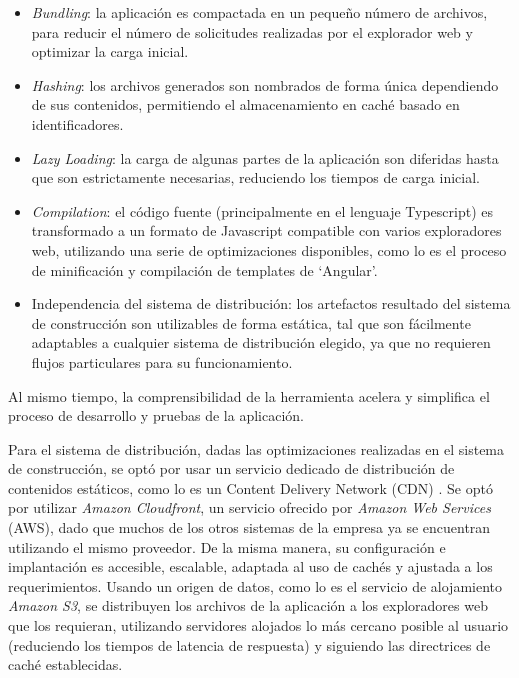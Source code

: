 \begin{itemize}
  \item \textit{Bundling}: la aplicación es compactada en un pequeño número de archivos, para reducir el número de solicitudes realizadas por el explorador web y optimizar la carga inicial.
  \item \textit{Hashing}: los archivos generados son nombrados de forma única dependiendo de sus contenidos, permitiendo el almacenamiento en caché basado en identificadores.
  \item \textit{Lazy Loading}: la carga de algunas partes de la aplicación son diferidas hasta que son estrictamente necesarias, reduciendo los tiempos de carga inicial.
  \item \textit{Compilation}: el código fuente (principalmente en el lenguaje Typescript) es transformado a un formato de Javascript compatible con varios exploradores web, utilizando una serie de optimizaciones disponibles, como lo es el proceso de minificación y compilación de templates de `Angular'.
  \item Independencia del sistema de distribución: los artefactos resultado del sistema de construcción son utilizables de forma estática, tal que son fácilmente adaptables a cualquier sistema de distribución elegido, ya que no requieren flujos particulares para su funcionamiento.
\end{itemize}

Al mismo tiempo, la comprensibilidad de la herramienta acelera y simplifica el proceso de desarrollo y pruebas de la aplicación.

Para el sistema de distribución, dadas las optimizaciones realizadas en el sistema de construcción, se optó por usar un servicio dedicado de distribución de contenidos estáticos, como lo es un Content Delivery Network (CDN) \cite{cdn}. Se optó por utilizar \textit{Amazon Cloudfront}, un servicio ofrecido por \textit{Amazon Web Services} (AWS), dado que muchos de los otros sistemas de la empresa ya se encuentran utilizando el mismo proveedor. De la misma manera, su configuración e implantación es accesible, escalable, adaptada al uso de cachés y ajustada a los requerimientos. Usando un origen de datos, como lo es el servicio de alojamiento \textit{Amazon S3}, se distribuyen los archivos de la aplicación a los exploradores web que los requieran, utilizando servidores alojados lo más cercano posible al usuario (reduciendo los tiempos de latencia de respuesta) y siguiendo las directrices de caché establecidas.

